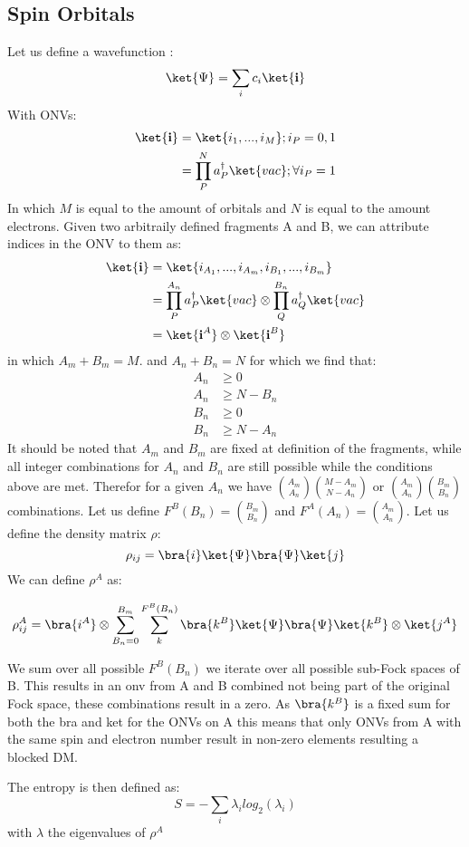   \subsection{Spin Orbitals}
  Let us define a wavefunction :
  \begin{equation}
    \ket{\Psi} = \sum_i c_i \ket{\textbf{i}}
  \end{equation}
  With ONVs:
  \begin{align}
      \ket{\textbf{i}} &= \ket{i_1, ..., i_M} ; i_P = 0,1 \\
      &= \prod^{N}_{P} a^{\dagger}_P \ket{vac} ; \forall i_P = 1
  \end{align}
  In which $M$ is equal to the amount of orbitals and $N$ is equal to the amount electrons.
  Given two arbitraily defined fragments A and B, we can attribute indices in the ONV to them as:
  \begin{align}
  \ket{\textbf{i}} &= \ket{i_{A_1},...,i_{A_m},i_{B_1},...,i_{B_m}} \\
   &= \prod^{A_n}_{P} a^{\dagger}_P \ket{vac} \otimes \prod^{B_n}_{Q}  a^{\dagger}_Q \ket{vac} \\
   &= \ket{\textbf{i}^A} \otimes \ket{\textbf{i}^B}
  \end{align}
  in which $A_m + B_m = M$. and $A_n + B_n = N$ for which we find that:
  \begin{align}
    A_n &\geq 0 \\
    A_n &\geq N - B_n \\
    B_n &\geq 0 \\
    B_n &\geq N - A_n
  \end{align}
  It should be noted that $A_m$ and $B_m$ are fixed at definition of the fragments, while all integer combinations for $A_n$ and $B_n$ are still possible while the conditions above are met. Therefor for a given $A_n$ we have $\binom{A_m}{A_n} \binom{M-A_m}{N-A_n}$ or $\binom{A_m}{A_n} \binom{B_m}{B_n}$ combinations. Let us define $F^B(B_n) = \binom{B_m}{B_n}$ and $F^A(A_n)=\binom{A_m}{A_n}$.
  Let us define the density matrix ${\rho}$:
  \begin{equation}
  \rho_{ij} = \bra{i} \ket{\Psi} \bra{\Psi} \ket{j}
  \end{equation}
  We can define $\rho^A$ as:

  \begin{equation}
    \rho_{ij}^A = \bra{i^A} \otimes \sum_{B_n=0}^{B_m} \sum_{k}^{F^B(B_n)} \bra{k^B} \ket{\Psi} \bra{\Psi} \ket{k^B}  \otimes \ket{j^A}
  \end{equation}

We sum over all possible $F^B(B_n)$ we iterate over all possible sub-Fock spaces of B. This results in an onv from A and B combined not being part of the original Fock space, these combinations result in a zero. As $\bra{k^B}$ is a fixed sum for both the bra and ket for the ONVs on A this means that only ONVs from A with the same spin and electron number result in non-zero elements resulting a blocked DM.

  The entropy is then defined as:
  \begin{equation}
    S = - \sum_i \lambda_i log_2 (\lambda_i)
  \end{equation}
  with $\lambda$ the eigenvalues of $\rho^A$

